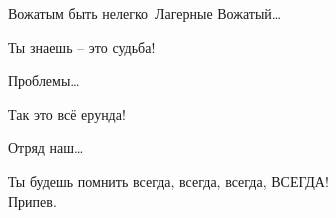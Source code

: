 \documentclass[11pt,a5paper]{book}
\begin{document}
\begin{song}{Вожатым быть нелегко}{}{~}{Лагерные}{}{}
Вожатый…\par
Ты знаешь -- это судьба!\par
Проблемы…\par
Так это всё ерунда!\par
Отряд наш…\par
Ты будешь помнить всегда, всегда, всегда, ВСЕГДА!\\

Припев.\\

\begin{SBSection*}
\begin{figure}[b!]
\end{figure}
\end{SBSection*}

\end{song}
\end{document}
